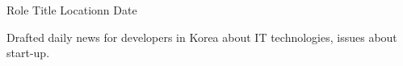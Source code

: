 

\begin{cventries}

  \cventry
  {Role} %
  {Title} %
  {Locationn} %
  {Date} %
  {
    \begin{cvitems} %
      \item {Drafted daily news for developers in Korea about IT technologies, issues about start-up.}
    \end{cvitems}
  }

\end{cventries}
